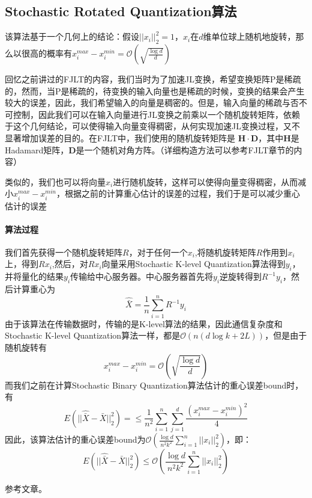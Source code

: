 \documentclass[lang=cn,newtx,10pt,scheme=chinese,chinesefont=nofont,citestyle=gb7714-2015, bibstyle=gb7714-2015]{elegantbook}
\begin{document}
\begin{refsection}
\subsection{Stochastic Rotated Quantization算法}
该算法基于一个几何上的结论：假设$||x_{i}||^2_{2} = 1$，$x_{i}$在$d$维单位球上随机地旋转，那么以很高的概率有$x_{i}^{max} - x_{i}^{min} = \mathcal{O}(\sqrt{\frac{\log d}{d}})$


回忆之前讲过的FJLT的内容，我们当时为了加速JL变换，希望变换矩阵P是稀疏的，然而，当P是稀疏的，待变换的输入向量也是稀疏的时候，变换的结果会产生较大的误差，因此，我们希望输入的向量是稠密的。但是，输入向量的稀疏与否不可控制，因此我们可以在输入向量进行JL变换之前乘以一个随机旋转矩阵，依赖于这个几何结论，可以使得输入向量变得稠密，从何实现加速JL变换过程，又不显著增加误差的目的。在FJLT中，我们使用的随机旋转矩阵是 $\mathbf{H}\cdot \mathbf{D}$，其中$\mathbf{H}$是Hadamard矩阵，$\mathbf{D}$是一个随机对角方阵。（详细构造方法可以参考FJLT章节的内容）


类似的，我们也可以将向量$x_{i}$进行随机旋转，这样可以使得向量变得稠密，从而减小$x_{i}^{max} - x_{i}^{min}$，根据之前的计算重心估计的误差的过程，我们于是可以减少重心估计的误差
\paragraph{算法过程} 我们首先获得一个随机旋转矩阵$R$，对于任何一个$x_{i}$,将随机旋转矩阵$R$作用到$x_{i}$上，得到$Rx_{i}$,然后，对$Rx_{i}$向量采用Stochastic K-level Quantization算法得到$y_{i}$，并将量化的结果$y_{i}$传输给中心服务器。中心服务器首先将$y_{i}$逆旋转得到$R^{-1}y_{i}$，然后计算重心为
\[
\hat{\bar{X}} = \frac{1}{n}\sum_{i = 1}^{n} R^{-1}y_{i}
\]
由于该算法在传输数据时，传输的是K-level算法的结果，因此通信复杂度和Stochastic K-level Quantization算法一样，都是$\mathcal{O}(n(d\log k + 2L))$，但是由于随机旋转有
\[
x_{i}^{max} - x_{i}^{min} = \mathcal{O}(\sqrt{\frac{\log d}{d}})
\]
而我们之前在计算Stochastic Binary Quantization算法估计的重心误差bound时，有
\[
 E(||\hat{\bar{X}} - \bar{X}||_{2}^2) = \leq \frac{1}{n^2} \sum_{i=1}^{n} \sum_{j = 1}^{d} \frac{(x_{i}^{max} - x_{i}^{min})^2}{4}
\]
因此，该算法估计的重心误差bound为$\mathcal{O}(\frac{\log d}{n^2k^2} \sum_{i =1}^{n}||x_{i}||_{2}^2)$，即：
\[
E(||\hat{\bar{X}} - \bar{X}||_{2}^2) \leq \mathcal{O}(\frac{\log d}{n^2k^2} \sum_{i =1}^{n}||x_{i}||_{2}^2)
\]

参考文章\cite{suresh2017distributed}。








\printbibliography[heading=subbibliography, title={本章参考文献}]
\end{refsection}
\end{document}
